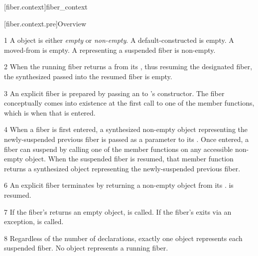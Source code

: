 [fiber.context]{fiber\_context}

[fiber.context.pre]{Overview}

1 A \fiber object is either \emph{empty} or \emph{non-empty}. A
default-constructed \fiber is empty. A moved-from \fiber is empty. A \fiber
representing a suspended fiber is non-empty.

2 When the running fiber returns a \fiber from its \entryfn, thus resuming the
designated fiber, the synthesized \fiber passed into the resumed fiber is
empty.

3 An explicit fiber is prepared by passing an \emph{\entryfn} to \fiber's
constructor. The fiber conceptually comes into existence at the first call to
one of the \anyresume member functions, which is when that \entryfn is
entered.

4 When a fiber is first entered, a synthesized non-empty \fiber object
representing the newly-suspended previous fiber is passed as a parameter to
its \entryfn. Once entered, a fiber can suspend by calling one of the \anyresume
member functions on any accessible non-empty \fiber object. When the
suspended fiber is resumed, that member function returns a synthesized \fiber object
representing the newly-suspended previous fiber.

6 An explicit fiber terminates by returning a non-empty \fiber object from
its \entryfn.  is resumed.



7 If the fiber's \entryfn returns an empty \fiber object,  is called.
If the fiber's \entryfn exits via an exception,  is called.

8 Regardless of the number of \fiber declarations, exactly one \fiber object
represents each suspended fiber. No \fiber object represents a running fiber.

